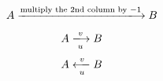 \documentclass{article}
\begin{document}
\[ A \xlongrightarrow{\text{multiply the $2$nd column by $-1$}} B \]
\[ A \xlongrightarrow[u]{v} B \]
\[ A \xlongleftarrow[u]{v} B \]
\end{document}
